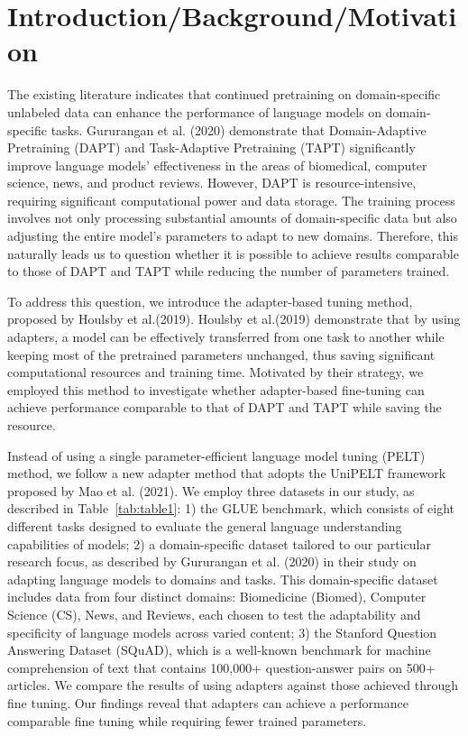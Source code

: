 \documentclass[10pt,twocolumn,letterpaper]{article}
\begin{document}
\section{Introduction/Background/Motivation}

The existing literature indicates that continued pretraining on domain-specific unlabeled data can enhance the performance of language models on domain-specific tasks. Gururangan et al. (2020)\cite{Gururangan2020DontStop} demonstrate that Domain-Adaptive Pretraining (DAPT) and Task-Adaptive Pretraining (TAPT) significantly improve language models' effectiveness in the areas of biomedical, computer science, news, and product reviews. However, DAPT is resource-intensive, requiring significant computational power and data storage. The training process involves not only processing substantial amounts of domain-specific data but also adjusting the entire model's parameters to adapt to new domains. Therefore, this naturally leads us to question whether it is possible to achieve results comparable to those of DAPT and TAPT while reducing the number of parameters trained. 

To address this question, we introduce the adapter-based tuning method, proposed by Houlsby et al.(2019)\cite{Houlsby2019}. Houlsby et al.(2019) demonstrate that by using adapters, a model can be effectively transferred from one task to another while keeping most of the pretrained parameters unchanged, thus saving significant computational resources and training time. Motivated by their strategy, we employed this method to investigate whether adapter-based fine-tuning can achieve performance comparable to that of DAPT and TAPT while saving the resource.

Instead of using a single parameter-efficient language model tuning (PELT) method, we follow a new adapter method that adopts the UniPELT framework proposed by Mao et al. (2021). We employ three datasets in our study, as described in Table~\ref{tab:table1}: 1) the GLUE benchmark\cite{Wang2019GLUE}, which consists of eight different tasks designed to evaluate the general language understanding capabilities of models; 2) a domain-specific dataset tailored to our particular research focus, as described by Gururangan et al. (2020)  \cite{Gururangan2020DontStop} in their study on adapting language models to domains and tasks. This domain-specific dataset includes data from four distinct domains: Biomedicine (Biomed), Computer Science (CS), News, and Reviews, each chosen to test the adaptability and specificity of language models across varied content; 3) the Stanford Question Answering Dataset (SQuAD)\cite{DBLP}, which is a well-known benchmark for machine comprehension of text that contains 100,000+ question-answer pairs on 500+ articles. We compare the results of using adapters against those achieved through fine tuning. Our findings reveal that adapters can achieve a performance comparable fine tuning while requiring fewer trained parameters. 
\end{document}
